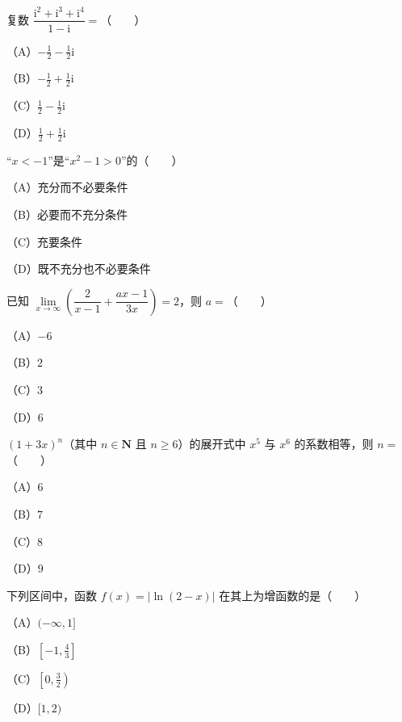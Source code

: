 

\begin{question}
复数 $\dfrac{\mathrm i^2+\mathrm i^3+\mathrm i^4}{1-\mathrm i}=$\mbox{（　　）}

（A）$-\frac12-\frac12\mathrm i$

（B）$-\frac12+\frac12\mathrm i$

（C）$\frac12-\frac12\mathrm i$

（D）$\frac12+\frac12\mathrm i$

\end{question}
\begin{question}
“$x<-1$”是“$x^2-1>0$”的\mbox{（　　）}

（A）充分而不必要条件

（B）必要而不充分条件

（C）充要条件

（D）既不充分也不必要条件

\end{question}
\begin{question}
已知 $\lim\limits_{x\to\infty}\left(\dfrac2{x-1}+\dfrac{ax-1}{3x}\right)=2$，则 $a=$\mbox{（　　）}

（A）$-6$

（B）$2$

（C）$3$

（D）$6$

\end{question}
\begin{question}
$(1+3x)^n$（其中 $n\in\mathbf N$ 且 $n\geqslant6$）的展开式中 $x^5$ 与 $x^6$ 的系数相等，则 $n=$\mbox{（　　）}

（A）$6$

（B）$7$

（C）$8$

（D）$9$

\end{question}
\begin{question}
下列区间中，函数 $f(x)=|\ln(2-x)|$ 在其上为增函数的是\mbox{（　　）}

（A）$(-\infty,1]$

（B）$\left[-1,\frac43\right]$

（C）$\left[0,\frac32\right)$

（D）$[1,2)$

\end{question}
